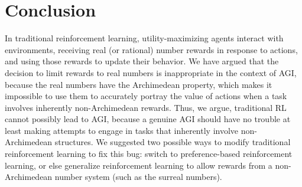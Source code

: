 \documentclass[reqno]{article}
\theoremstyle{definition}
\begin{document}
\section{Conclusion}

In traditional reinforcement learning, utility-maximizing agents interact
with environments, receiving real (or rational) number rewards in response to
actions, and using those rewards to update their behavior. We have argued that
the decision to limit rewards to real numbers is inappropriate in the context
of AGI, because the real numbers have the Archimedean property, which makes it
impossible to use them to accurately portray the value of actions when a task
involves inherently non-Archimedean rewards. Thus, we argue, traditional
RL cannot possibly lead to AGI, because a genuine AGI should have no trouble
at least making attempts to engage in tasks that inherently involve
non-Archimedean structures. We suggested two possible ways
to modify traditional reinforcement learning to fix this bug: switch to
preference-based reinforcement learning, or else generalize reinforcement learning
to allow rewards from a non-Archimedean number system (such as the surreal numbers).




\end{document}
